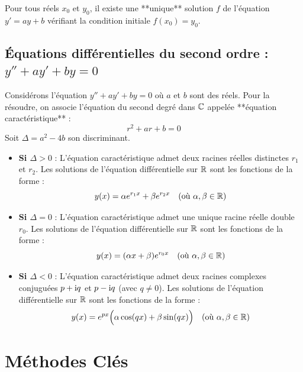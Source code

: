 \begin{propriete}
Pour tous réels $x_0$ et $y_0$, il existe une **unique** solution $f$ de l'équation $y' = ay + b$ vérifiant la condition initiale $f(x_0) = y_0$.
\end{propriete}

\subsection{Équations différentielles du second ordre : $y'' + ay' + by = 0$}

Considérons l'équation $y'' + ay' + by = 0$ où $a$ et $b$ sont des réels.
Pour la résoudre, on associe l'équation du second degré dans $\mathbb{C}$ appelée **équation caractéristique** :
\[
r^2 + ar + b = 0
\]
Soit $\Delta = a^2 - 4b$ son discriminant.

\begin{theoreme}[Solutions de $y'' + ay' + by = 0$]
\begin{itemize}
    \item \textbf{Si $\Delta > 0$} : L'équation caractéristique admet deux racines réelles distinctes $r_1$ et $r_2$.
    Les solutions de l'équation différentielle sur $\mathbb{R}$ sont les fonctions de la forme :
    \[
    y(x) = \alpha e^{r_1 x} + \beta e^{r_2 x} \quad (\text{où } \alpha, \beta \in \mathbb{R})
    \]
    \item \textbf{Si $\Delta = 0$} : L'équation caractéristique admet une unique racine réelle double $r_0$.
    Les solutions de l'équation différentielle sur $\mathbb{R}$ sont les fonctions de la forme :
    \[
    y(x) = (\alpha x + \beta) e^{r_0 x} \quad (\text{où } \alpha, \beta \in \mathbb{R})
    \]
    \item \textbf{Si $\Delta < 0$} : L'équation caractéristique admet deux racines complexes conjuguées $p + \mathrm{i} q$ et $p - \mathrm{i} q$ (avec $q \ne 0$).
    Les solutions de l'équation différentielle sur $\mathbb{R}$ sont les fonctions de la forme :
    \[
    y(x) = e^{px} \Big( \alpha \cos(qx) + \beta \sin(qx) \Big) \quad (\text{où } \alpha, \beta \in \mathbb{R})
    \]
\end{itemize}
\end{theoreme}

\section{Méthodes Clés}

